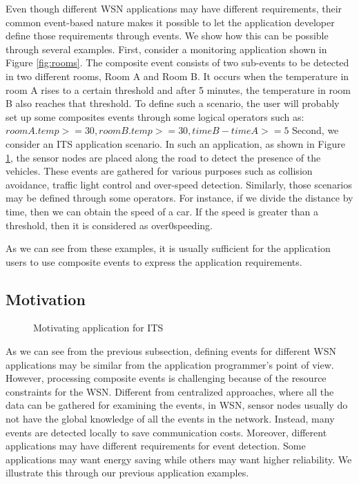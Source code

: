 Even though different WSN applications may have different requirements, their common event-based nature makes it possible to let the application developer define those requirements through events. We show how this can be possible through several examples. First, consider a monitoring application shown in Figure \ref{fig:rooms}. The composite event consists of two sub-events to be detected in two different rooms, Room A and Room B. It occurs when the temperature in room A rises to a certain threshold and after 5 minutes, the temperature in room B also reaches that threshold. To define such a scenario, the user will probably set up some composites events through some logical operators such as: \(roomA.temp >= 30, roomB.temp >= 30, timeB - timeA >= 5\) Second, we consider an ITS application scenario. In such an application, as shown in Figure \ref{fig:its}, the sensor nodes are placed along the road to detect the presence of the vehicles. These events are gathered for various purposes such as collision avoidance, traffic light control and over-speed detection. Similarly, those scenarios may be defined through some operators. For instance, if we divide the distance by time, then we can obtain the speed of a car. If the speed is greater than a threshold, then it is considered as over0speeding.

As we can see from these examples, it is usually sufficient for the application users to use composite events to express the application requirements.

\subsection{Motivation}

\begin{figure}
\centering
{}
\caption{Motivating application for ITS}
\label{fig:its}
\end{figure}

As we can see from the previous subsection, defining events for different WSN applications may be similar from the application programmer's point of view. However, processing composite events is challenging because of the resource constraints for the WSN. Different from centralized approaches, where all the data can be gathered for examining the events, in WSN, sensor nodes usually do not have the global knowledge of all the events in the network. Instead, many events are detected locally to save communication costs. Moreover, different applications may have different requirements for event detection. Some applications may want energy saving while others may want higher reliability. We illustrate this through our previous application examples.

